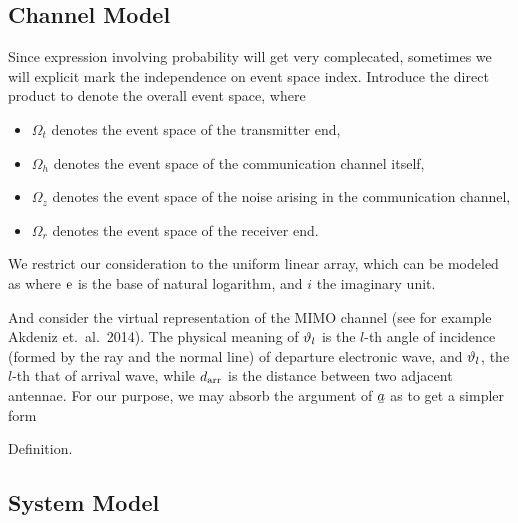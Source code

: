 
\subsection{Channel Model}

Since expression involving probability will get very complecated, sometimes we will explicit mark the independence on event space index.
Introduce the direct product
%
%
to denote the overall event space, where

\begin{itemize}
\item \(\Omega_t\) denotes the event space of the transmitter end,
\item \(\Omega_h\) denotes the event space of the communication channel itself,
\item \(\Omega_z\) denotes the event space of the noise arising in the communication channel,
\item \(\Omega_r\) denotes the event space of the receiver end.
\end{itemize}
%

We restrict our consideration to the uniform linear array, which can be modeled as
%
%
where \(\mathrm{e}\) is the base of natural logarithm, and \(i\) the imaginary unit.

And consider the virtual representation of the MIMO channel (see for example Akdeniz et.\ al.\ 2014).
%
%
The physical meaning of \(\vartheta_l\) is the \(l\)-th angle of incidence (formed by the ray and the normal line) of departure electronic wave, and \(\vartheta_l\), the \(l\)-th that of arrival wave, while \(d_{\mathrm{arr}}\) is the distance between two adjacent antennae.
For our purpose, we may absorb the argument of \(\V{a}\) as
%
%
to get a simpler form
%
%

\Result
{Definition.}
{
}

\subsection{System Model}


